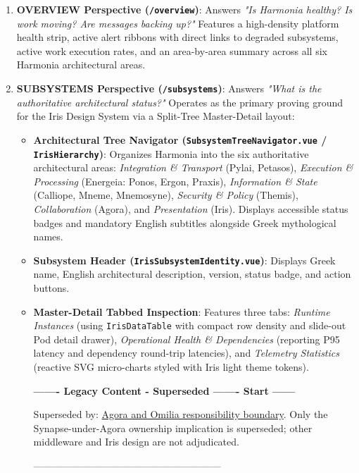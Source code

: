 \begin{enumerate}
    \item \textbf{OVERVIEW Perspective (\texttt{/overview})}:
    Answers \textit{"Is Harmonia healthy? Is work moving? Are messages backing up?"}
    Features a high-density platform health strip, active alert ribbons with direct links to degraded subsystems, active work execution rates, and an area-by-area summary across all six Harmonia architectural areas.

    \item \textbf{SUBSYSTEMS Perspective (\texttt{/subsystems})}:
    Answers \textit{"What is the authoritative architectural status?"}
    Operates as the primary proving ground for the Iris Design System via a Split-Tree Master-Detail layout:
    \begin{itemize}
        \item \textbf{Architectural Tree Navigator (\texttt{SubsystemTreeNavigator.vue} / \texttt{IrisHierarchy})}: Organizes Harmonia into the six authoritative architectural areas: \textit{Integration \& Transport} (Pylai, Petasos), \textit{Execution \& Processing} (Energeia: Ponos, Ergon, Praxis), \textit{Information \& State} (Calliope, Mneme, Mnemosyne), \textit{Security \& Policy} (Themis), \textit{Collaboration} (Agora), and \textit{Presentation} (Iris). Displays accessible status badges and mandatory English subtitles alongside Greek mythological names.
        \item \textbf{Subsystem Header (\texttt{IrisSubsystemIdentity.vue})}: Displays Greek name, English architectural description, version, status badge, and action buttons.
        \item \textbf{Master-Detail Tabbed Inspection}: Features three tabs: \textit{Runtime Instances} (using \texttt{IrisDataTable} with compact row density and slide-out Pod detail drawer), \textit{Operational Health \& Dependencies} (reporting P95 latency and dependency round-trip latencies), and \textit{Telemetry Statistics} (reactive SVG micro-charts styled with Iris light theme tokens).

\par\noindent\textbf{------- Legacy Content - Superseded ------- Start ------}
\par\noindent Superseded by: \href{../../markdown/05-information-systems-architecture/agora-omilia-collaboration.md\#control-and-operations}{Agora and Omilia responsibility boundary}. Only the Synapse-under-Agora ownership implication is superseded; other middleware and Iris design are not adjudicated.
\par\noindent ---------------------------------------------------------


\end{itemize}
\end{enumerate}
